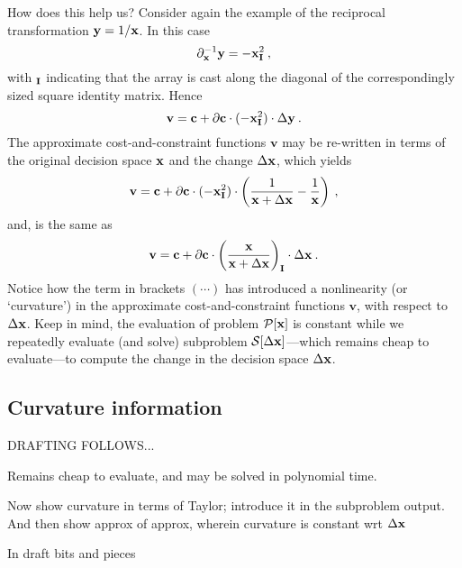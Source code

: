 \documentclass[11pt]{article}
\begin{document}
How does this help us? Consider again the example of the reciprocal transformation $\mathbf{y} = 1/ \mathbf{x}$. In this case
\begin{equation}
\partial_{\mathbf{x}}^{-1} \mathbf{y} = - \mathbf{x}_{\mathbf{I}}^2   \: ,
\end{equation}
with $_{\mathbf{I}}$ indicating that the array is cast along the diagonal of the correspondingly sized square identity matrix. Hence
\begin{equation}
    \textbf{v} = \mathbf{c} + \partial \mathbf{c}  \cdot (-\mathbf{x}_{\mathbf{I}}^2) \cdot \Delta \mathbf{y}  \:.
\end{equation}
The approximate cost-and-constraint functions $\textbf{v}$ may be re-written in terms of the original decision space $\mathbf{x}$ and the change $\Delta \mathbf{x}$, which yields
\begin{equation}
    \textbf{v} = \mathbf{c} + \partial \mathbf{c} \cdot (-\mathbf{x}_{\mathbf{I}}^2)  \cdot \left( \frac{1}{ \mathbf{x} + \Delta\mathbf{x}} - \frac{1}{\mathbf{x}} \right)   \:,
\end{equation}
and, is the same as
\begin{equation}
    \textbf{v} = \mathbf{c} + \partial \mathbf{c}  \cdot \left( \frac{\mathbf{x}}{\mathbf{x} + \Delta \mathbf{x}} \right)_{\mathbf{I}}\cdot \Delta \mathbf{x}   \:.
\end{equation}
Notice how the term in brackets $(\cdots)$ has introduced a nonlinearity (or `curvature') in the approximate cost-and-constraint functions $\textbf{v}$, with respect to $\Delta \mathbf{x}$. Keep in mind, the evaluation of problem $\mathcal{P} [\mathbf{x}]$ is constant while we repeatedly evaluate (and solve) subproblem $\mathcal{S}[\Delta \mathbf{x}]$---which remains cheap to evaluate---to compute the change in the decision space $\Delta \mathbf{x}$. 

\subsection{Curvature information}

\bigskip

DRAFTING FOLLOWS...

\bigskip

Remains cheap to evaluate, and may be solved in polynomial time.

Now show curvature in terms of Taylor; introduce it in the subproblem output. And then show approx of approx, wherein curvature is constant wrt $\Delta \mathbf{x}$

\newpage

In draft bits and pieces
\end{document}
